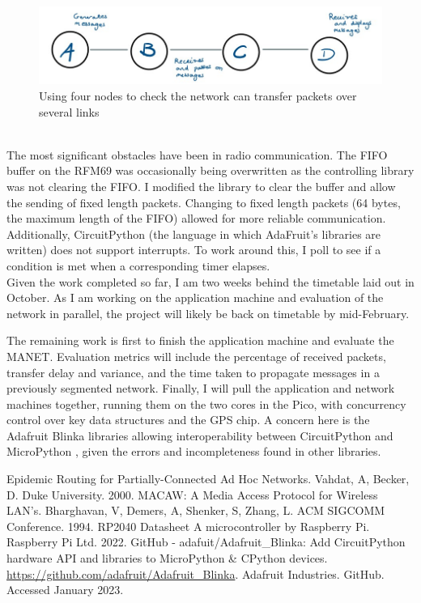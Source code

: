 \documentclass[10pt, a4paper]{article}
\begin{document}
\begin{figure}[h]
\caption{Using four nodes to check the network can transfer packets over several links}
\begin{center}
\includegraphics[scale=0.4]{test2.jpg}
\end{center}
\end{figure} \\

The most significant obstacles have been in radio communication. The FIFO buffer on the RFM69 was occasionally being overwritten as the controlling library was not clearing the FIFO. I modified the library to clear the buffer and allow the sending of fixed length packets. Changing to fixed length packets (64 bytes, the maximum length of the FIFO) allowed for more reliable communication. Additionally, CircuitPython (the language in which AdaFruit's libraries are written) does not support interrupts. To work around this, I poll to see if a condition is met when a corresponding timer elapses. \\

Given the work completed so far, I am two weeks behind the timetable laid out in October. As I am working on the application machine and evaluation of the network in parallel, the project will likely be back on timetable by mid-February.

The remaining work is first to finish the application machine and evaluate the MANET. Evaluation metrics will include the percentage of received packets, transfer delay and variance, and the time taken to propagate messages in a previously segmented network. Finally, I will pull the application and network machines together, running them on the two cores in the Pico, with concurrency control over key data structures and the GPS chip. A concern here is the Adafruit Blinka libraries allowing interoperability between CircuitPython and MicroPython \cite{blinka}, given the errors and incompleteness found in other libraries. 

\begin{thebibliography}{9}
 Epidemic Routing for Partially-Connected Ad Hoc Networks. Vahdat, A, Becker, D. Duke University. 2000.
 MACAW: A Media Access Protocol for Wireless LAN's. Bharghavan, V, Demers, A, Shenker, S, Zhang, L. ACM SIGCOMM Conference. 1994.
 RP2040 Datasheet A microcontroller by Raspberry Pi. Raspberry Pi Ltd. 2022.
 GitHub - adafuit/Adafruit\_Blinka: Add CircuitPython hardware API and libraries to MicroPython \& CPython devices. \url{https://github.com/adafruit/Adafruit_Blinka}. Adafruit Industries. GitHub. Accessed January 2023. 
\end{thebibliography}
\end{document}
